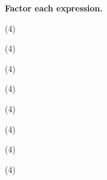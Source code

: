 \documentclass[12pt,a4paper]{exam}
\begin{document}
\begin{center}\Large\bfseries Factor each expression.\end{center}
\vspace{1mm}
\begin{questions}
\Large

\question
\begin{tasks}(4)
  \task {}
  \task {}
  \task {}
  \task {}
\end{tasks}

\Large
\question


\begin{tasks}(4)
  \task {}
  \task {}
  \task {}
  \task {}
\end{tasks}

\Large


\question
\begin{tasks}(4)
  \task {}
  \task {}
  \task {}
  \task {}
\end{tasks}

\question
\begin{tasks}(4)
  \task {}
  \task {}
  \task {}
  \task {}
\end{tasks}

\question
\begin{tasks}(4)
  \task {}
  \task {}
  \task {}
  \task {}
\end{tasks}

\question
\begin{tasks}(4)
  \task {}
  \task {}
  \task {}
  \task {}
\end{tasks}

\question
\begin{tasks}(4)
  \task {}
  \task {}
  \task {}
  \task {}
\end{tasks}

\question
\begin{tasks}(4)
  \task {}
  \task {}
  \task {}
  \task {}
\end{tasks}


\end{questions}
\end{document}
